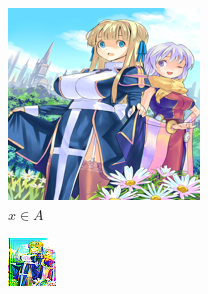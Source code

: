 \documentclass[twocolumn,11pt]{ctexart}
\begin{document}
\begin{figure}[htb]
    \centering
    \begin{subfigure}[b]{0.23\linewidth}
        \includegraphics[width=\linewidth]{exp7_epoch061_real_A.png}
        \caption{$x \in A$}
      \end{subfigure}
      \begin{subfigure}[b]{0.23\linewidth}
        \includegraphics[width=\linewidth]{exp7_epoch061_fake_B.png}

\end{subfigure}
\end{figure}
\end{document}
